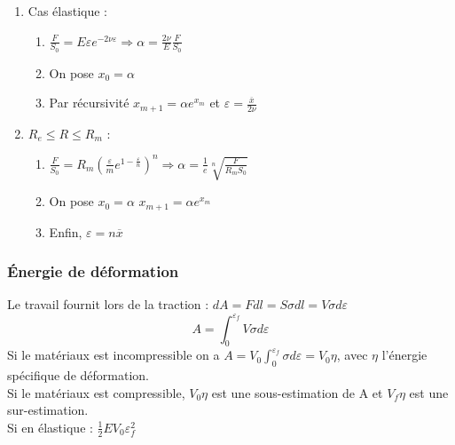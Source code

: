 \documentclass[../main.tex]{subfiles}
\begin{document}
\begin{enumerate}
    \item Cas élastique : \begin{enumerate}
        \item $\frac{F}{S_0} = E\varepsilon e^{-2\nu \varepsilon} \Rightarrow \alpha = \frac{2\nu}{E} \frac{F}{S_0}$\\
        \item On pose $x_0 = \alpha$\\
        \item Par récursivité $x_{m+1} = \alpha e^{x_m}$ et $\varepsilon = \frac{\overline{x}}{2\nu}$\\
    \end{enumerate}
    \item $R_e \leq R \leq R_m$ : \begin{enumerate}
        \item $\frac{F}{S_0} = R_m(\frac{\varepsilon}{m} e^{1-\frac{\varepsilon}{n}})^n \Rightarrow \alpha = \frac{1}{e}\sqrt[n]{\frac{F}{R_m S_0}}$\\
        \item On pose $x_0 = \alpha$ $x_{m+1} = \alpha e^{x_m}$\\
        \item Enfin, $\varepsilon = n \overline{x}$\\
    \end{enumerate}
\end{enumerate}


\subsubsection{Énergie de déformation}
Le travail fournit lors de la traction : $dA = Fdl = S\sigma dl = V\sigma d\varepsilon$\\
\begin{equation}
    A = \int_0^{\varepsilon_f}V\sigma d\varepsilon
\end{equation}
Si le matériaux est incompressible on a $A = V_0 \int_0^{\varepsilon_f}\sigma d\varepsilon = V_0 \eta$, avec $\eta$ l'énergie spécifique de déformation. \\

Si le matériaux est compressible, $V_0\eta$ est une sous-estimation de A et $V_f\eta$ est une sur-estimation.\\

Si en élastique : $\frac{1}{2}EV_0\varepsilon_f^2$\\
\end{document}
